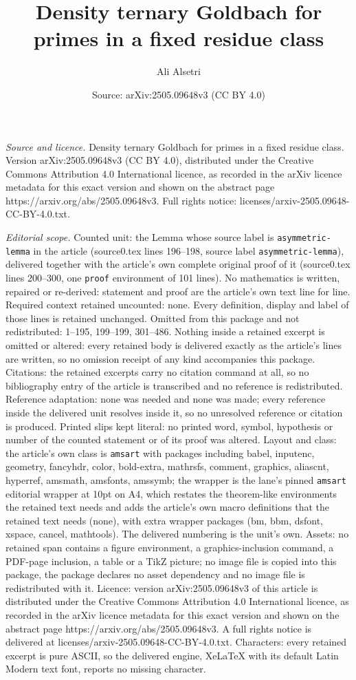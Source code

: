 \documentclass[10pt,a4paper]{amsart}
\title[Density ternary Goldbach for primes in a fixed residue class]{Density ternary Goldbach for primes in a fixed residue class}
\author{Ali Alsetri}
\date{Source: arXiv:2505.09648v3 (CC BY 4.0)}
\begin{document}
\maketitle

\noindent\emph{Source and licence.} Density ternary Goldbach for primes in a fixed residue class. Version arXiv:2505.09648v3 (CC BY 4.0), distributed under the Creative Commons Attribution 4.0 International licence, as recorded in the arXiv licence metadata for this exact version and shown on the abstract page https://arxiv.org/abs/2505.09648v3. Full rights notice: licenses/arxiv-2505.09648-CC-BY-4.0.txt.\par\smallskip

\noindent\textit{Editorial scope.} Counted unit: the Lemma whose source label is \texttt{asymmetric-lemma} in the article (source0.tex lines 196--198, source label \texttt{asymmetric-lemma}), delivered together with the article's own complete original proof of it (source0.tex lines 200--300, one \texttt{proof} environment of 101 lines). No mathematics is written, repaired or re-derived: statement and proof are the article's own text line for line. Required context retained uncounted: none. Every definition, display and label of those lines is retained unchanged. Omitted from this package and not redistributed: 1--195, 199--199, 301--486. Nothing inside a retained excerpt is omitted or altered: every retained body is delivered exactly as the article's lines are written, so no omission receipt of any kind accompanies this package. Citations: the retained excerpts carry no citation command at all, so no bibliography entry of the article is transcribed and no reference is redistributed. Reference adaptation: none was needed and none was made; every reference inside the delivered unit resolves inside it, so no unresolved reference or citation is produced. Printed slips kept literal: no printed word, symbol, hypothesis or number of the counted statement or of its proof was altered. Layout and class: the article's own class is \texttt{amsart} with packages including babel, inputenc, geometry, fancyhdr, color, bold-extra, mathrsfs, comment, graphics, aliascnt, hyperref, amsmath, amsfonts, amssymb; the wrapper is the lane's pinned \texttt{amsart} editorial wrapper at 10pt on A4, which restates the theorem-like environments the retained text needs and adds the article's own macro definitions that the retained text needs (none), with extra wrapper packages (bm, bbm, dsfont, xspace, cancel, mathtools). The delivered numbering is the unit's own. Assets: no retained span contains a figure environment, a graphics-inclusion command, a PDF-page inclusion, a table or a TikZ picture; no image file is copied into this package, the package declares no asset dependency and no image file is redistributed with it. Licence: version arXiv:2505.09648v3 of this article is distributed under the Creative Commons Attribution 4.0 International licence, as recorded in the arXiv licence metadata for this exact version and shown on the abstract page https://arxiv.org/abs/2505.09648v3. A full rights notice is delivered at licenses/arxiv-2505.09648-CC-BY-4.0.txt. Characters: every retained excerpt is pure ASCII, so the delivered engine, XeLaTeX with its default Latin Modern text font, reports no missing character.
\end{document}
